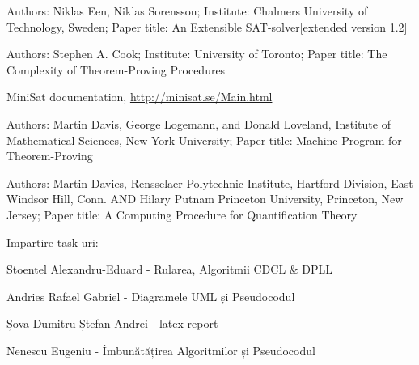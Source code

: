 \documentclass[runningheads]{llncs}
\begin{document}
\begin{thebibliography}{8}
Authors: Niklas Een, Niklas Sorensson; Institute: Chalmers University of Technology, Sweden; Paper title: An Extensible SAT-solver[extended version 1.2]

Authors: Stephen A. Cook; Institute: University of Toronto; Paper title: The Complexity of Theorem-Proving Procedures

MiniSat documentation, \url{http://minisat.se/Main.html}

Authors: Martin Davis, George Logemann, and
Donald Loveland,
Institute of Mathematical Sciences, New York University; Paper title: Machine Program for Theorem-Proving

 Authors: Martin Davies,
Rensselaer Polytechnic Institute, Hartford Division, East Windsor Hill, Conn.
AND
Hilary Putnam
Princeton University, Princeton, New Jersey; Paper title: A Computing Procedure for Quantification Theory

\end{thebibliography}
\newpage
Impartire task uri:

Stoentel Alexandru-Eduard - Rularea, Algoritmii CDCL \& DPLL

Andries Rafael Gabriel - Diagramele UML și Pseudocodul

Șova Dumitru Ștefan Andrei - latex report

Nenescu Eugeniu - Îmbunătățirea Algoritmilor și Pseudocodul
\end{document}
